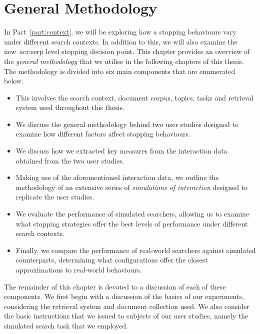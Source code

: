 
\chapter[General Methodology]{General Methodology}\label{chap:method}
In Part~\ref{part:context}, we will be exploring how a stopping behaviours vary under different search contexts. In addition to this, we will also examine the new~\gls{acr:serp} level stopping decision point. This chapter provides an overview of the \emph{general methodology} that we utilise in the following chapters of this thesis. The methodology is divided into six main components that are enumerated below.

\begin{itemize}
    \item{ This involves the search context, document corpus, topics, tasks and retrieval system used throughout this thesis.}
    \item{ We discuss the general methodology behind two user studies designed to examine how different factors affect stopping behaviours.}
    \item{ We discuss how we extracted key measures from the interaction data obtained from the two user studies.}
    \item{ Making use of the aforementioned interaction data, we outline the methodology of an extensive series of \emph{simulations of interaction} designed to replicate the user studies.}
    \item{ We evaluate the performance of simulated searchers, allowing us to examine what stopping strategies offer the best levels of performance under different search contexts.}
    \item{ Finally, we compare the performance of real-world searchers against simulated counterparts, determining what configurations offer the closest approximations to real-world behaviours.}
\end{itemize}

The remainder of this chapter is devoted to a discussion of each of these components. We first begin with a discussion of the basics of our experiments, considering the retrieval system and document collection used. We also consider the basic instructions that we issued to subjects of our user studies, namely the simulated search task that we employed.

